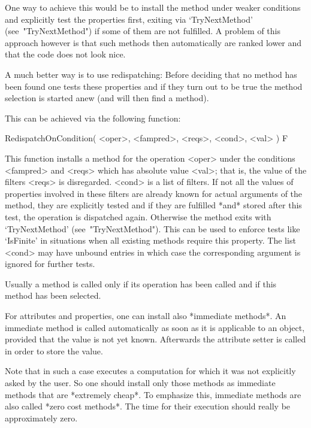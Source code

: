 One way to achieve this would be to install the method under weaker
conditions and explicitly test the properties first, exiting via
`TryNextMethod' (see~"TryNextMethod") if some of them are not fulfilled.
A problem of this approach however is that such methods then automatically
are ranked lower and that the code does not look nice.

A much better way is to use redispatching: Before deciding that no method
has been found one tests these properties and if they turn out to be true
the method selection is started anew (and will then find a method).

This can be achieved via the following function:

\>RedispatchOnCondition( <oper>, <fampred>, <reqs>, <cond>, <val> ) F

This function installs a method for the operation <oper> under the
conditions <fampred> and <reqs> which has absolute value <val>;
that is, the value of the filters <reqs> is disregarded.
<cond> is a list of filters.                                                
If not all the values of properties involved in these filters are already   
known for actual arguments of the method,
they are explicitly tested and if they are fulfilled *and* stored after     
this test, the operation is dispatched again.                               
Otherwise the method exits with `TryNextMethod' (see~"TryNextMethod").
This can be used to enforce tests like `IsFinite' in situations when all    
existing methods require this property.                                     
The list <cond> may have unbound entries in which case the corresponding    
argument is ignored for further tests.



Usually a method is called only if its operation has been called
and if this method has been selected.

For attributes and properties, one can install also *immediate methods*.
An immediate method is called automatically as soon as it is applicable
to an object, provided that the value is not yet known.
Afterwards the attribute setter is called in order to store the value.

Note that in such a case {\GAP} executes a computation for which
it was not explicitly asked by the user.
So one should install only those methods as immediate methods
that are *extremely cheap*.
To emphasize this, immediate methods are also called *zero cost methods*.
The time for their execution should really be approximately zero.

